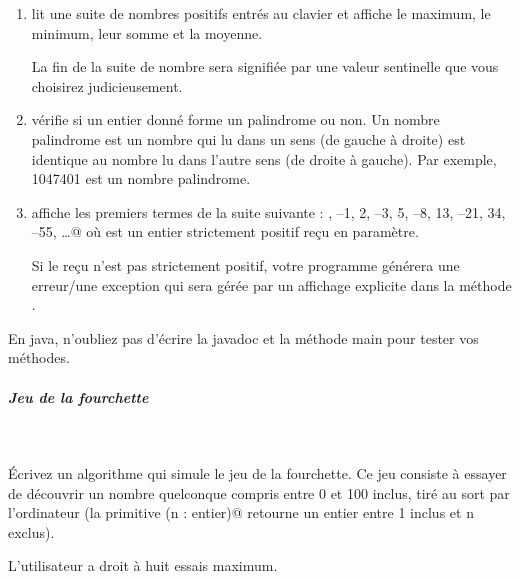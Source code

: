 \documentclass[11pt,a4paper]{article}
\begin{document}
\begin{enumerate}
			\item 
              lit une suite de nombres positifs entr\'es au clavier et affiche
              le maximum, le minimum, leur somme et la moyenne. \par
				
              La fin de la suite de nombre sera signifi\'ee par une valeur sentinelle que vous choisirez
              judicieusement.
            
			\item 
              v\'erifie si un entier donn\'e forme un palindrome ou non. Un nombre
              palindrome est un nombre qui lu dans un sens (de gauche \`a droite) est identique au nombre
              lu dans l'autre sens (de droite \`a gauche). Par exemple, 1047401 est un nombre palindrome.
            
			\item 
                affiche les \verb@n@ premiers termes de la suite suivante : 
                , –1, 2, –3, 5, –8, 13, –21, 34, –55, …@
                o\`u \verb@n@ est un entier strictement positif re\c cu en param\`etre.\par
				
                Si le \verb@n@ re\c cu n'est pas strictement positif, votre programme g\'en\'erera une erreur/une exception 
                qui sera g\'er\'ee par un affichage explicite dans la m\'ethode \verb@main@.
            
					\end{enumerate}
				
            \par
        En java, n'oubliez pas d'\'ecrire la javadoc et la m\'ethode main pour tester vos m\'ethodes.
            \par
        
			
		\subparagraph{Jeu de la fourchette} 
		
					\textcolor{white}{.} \par
				
          \'Ecrivez un algorithme qui simule le jeu de la fourchette. Ce jeu consiste \`a essayer de d\'ecouvrir
          un nombre quelconque compris entre 0 et 100 inclus, tir\'e au sort par l'ordinateur (la primitive
          \verb@hasard(n : entier)@ retourne un entier entre 1 inclus et n exclus). \par
				
          L'utilisateur a droit \`a huit essais maximum.\par
				
\end{document}
